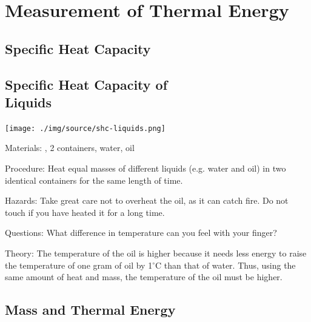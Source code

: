 \section{Measurement of Thermal Energy}

\begin{multicols}{2}


\section*{Specific Heat Capacity}


\subsection[Specific Heat Capacity of Liquids]{Specific Heat Capacity of \hfill \\ Liquids}

\begin{center}
\texttt{[image: ./img/source/shc-liquids.png]}
\end{center}

\begin{description*}
\item[Materials:]{, 2 containers, water, oil}
\item[Procedure:]{Heat equal masses of different liquids (e.g. water and oil) in two identical containers for the same length of time.}
\item[Hazards:]{Take great care not to overheat the oil, as it can catch fire. Do not touch if you have heated it for a long time.}
\item[Questions:]{What difference in temperature can you feel with your finger?}
\item[Theory:]{The temperature of the oil is higher because it needs less energy to raise the temperature of one gram of oil by 1$^\circ$C than that of water. Thus, using the same amount of heat and mass, the temperature of the oil must be higher.}
\end{description*}

\subsection{Mass and Thermal Energy}


\end{multicols}
